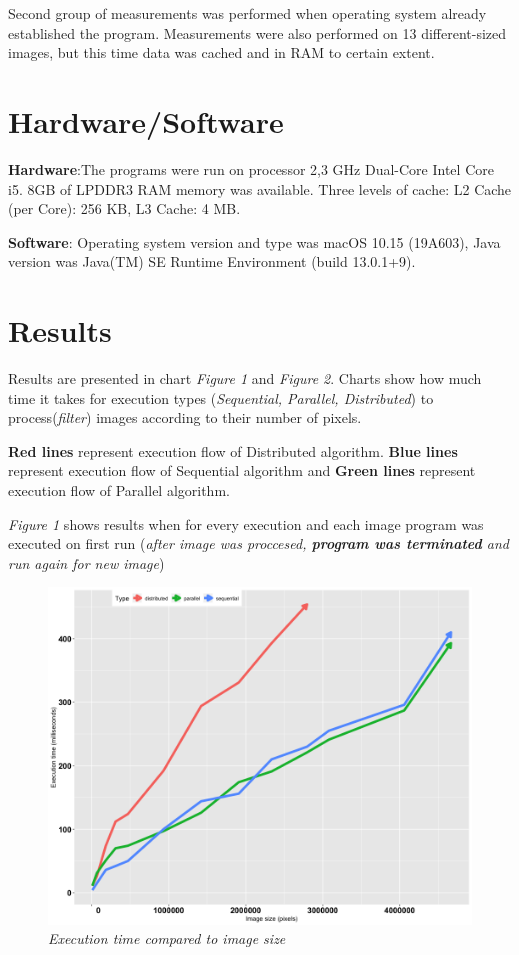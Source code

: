 \documentclass{article}
\begin{document}
Second group of measurements was performed when operating system already established the program. Measurements were also performed on 13 different-sized images, but this time data was cached and in RAM to certain extent. 

\section{Hardware/Software}

\textbf{Hardware}:The programs were run on processor 2,3 GHz Dual-Core Intel Core i5. 8GB of LPDDR3 RAM memory was available. Three levels of cache: L2 Cache (per Core):	256 KB, L3 Cache: 4 MB.

\textbf{Software}: Operating system version and type was macOS 10.15 (19A603),
Java version was Java(TM) SE Runtime Environment (build 13.0.1+9).

\section{Results}

Results are presented in chart\textit{ Figure 1} and \textit{Figure 2}. Charts show how much time it takes for execution types (\textit{Sequential, Parallel, Distributed}) to process(\textit{filter}) images according to their number of pixels. 

\textbf{Red lines} represent execution flow of Distributed algorithm.  \textbf{Blue lines} represent execution flow of Sequential algorithm and \textbf{Green lines} represent execution flow of Parallel algorithm.

\textit{Figure 1} shows results when for every execution and each image program was executed on first run (\textit{after image was proccesed, \textbf{program was terminated} and run again for new image})

\renewcommand{\figurename}{\textit{\textbf{Figure}}}
\setlength{\textfloatsep}{0pt}
\begin{figure}[h]
  \includegraphics[width=\linewidth]{bigBefore.png}
  \caption{\textit{Execution time compared to image size}}
\end{figure}
\end{document}
